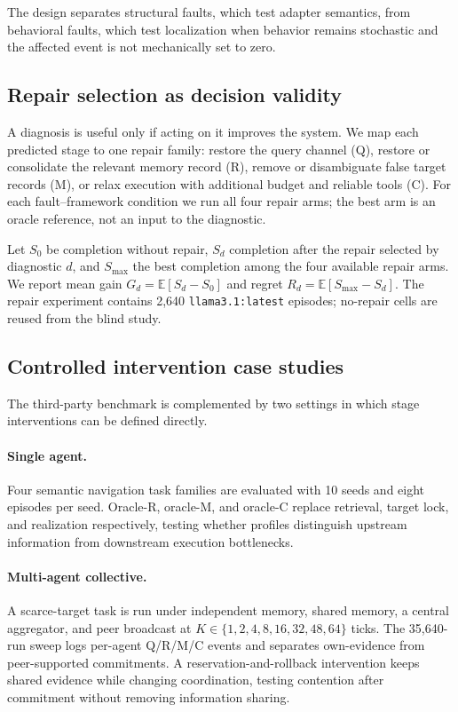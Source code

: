 \documentclass{article}
\newcommand{\qrmc}{Q/R/M/C}
\begin{document}
The design separates structural faults, which test adapter semantics, from behavioral faults, which test localization when behavior remains stochastic and the affected event is not mechanically set to zero.

\subsection{Repair selection as decision validity}

A diagnosis is useful only if acting on it improves the system. We map each predicted stage to one repair family: restore the query channel (Q), restore or consolidate the relevant memory record (R), remove or disambiguate false target records (M), or relax execution with additional budget and reliable tools (C). For each fault--framework condition we run all four repair arms; the best arm is an oracle reference, not an input to the diagnostic.

Let $S_0$ be completion without repair, $S_d$ completion after the repair selected by diagnostic $d$, and $S_{\max}$ the best completion among the four available repair arms. We report mean gain $G_d=\mathbb{E}[S_d-S_0]$ and regret $R_d=\mathbb{E}[S_{\max}-S_d]$. The repair experiment contains 2,640 \texttt{llama3.1:latest} episodes; no-repair cells are reused from the blind study.

\subsection{Controlled intervention case studies}

The third-party benchmark is complemented by two settings in which stage interventions can be defined directly.

\paragraph{Single agent.}
Four semantic navigation task families are evaluated with 10 seeds and eight episodes per seed. Oracle-R, oracle-M, and oracle-C replace retrieval, target lock, and realization respectively, testing whether profiles distinguish upstream information from downstream execution bottlenecks.

\paragraph{Multi-agent collective.}
A scarce-target task is run under independent memory, shared memory, a central aggregator, and peer broadcast at $K\in\{1,2,4,8,16,32,48,64\}$ ticks. The 35,640-run sweep logs per-agent \qrmc{} events and separates own-evidence from peer-supported commitments. A reservation-and-rollback intervention keeps shared evidence while changing coordination, testing contention after commitment without removing information sharing.
\end{document}
